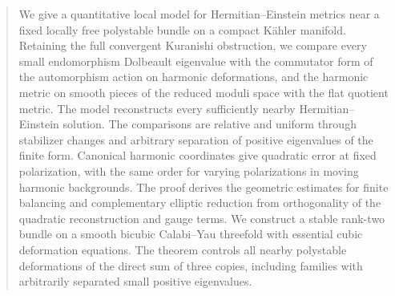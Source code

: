 

\begin{abstract}
We give a quantitative local model for Hermitian--Einstein metrics near a
fixed locally free polystable bundle on a compact K\"ahler manifold.
Retaining the full convergent Kuranishi obstruction, we compare every small
endomorphism Dolbeault eigenvalue with the commutator form of the automorphism
action on harmonic deformations, and the harmonic metric on smooth pieces
of the reduced moduli space with the flat quotient metric. The model
reconstructs every sufficiently nearby Hermitian--Einstein solution.
The comparisons are relative and uniform through stabilizer changes and
arbitrary separation of positive eigenvalues of the finite form.
Canonical harmonic coordinates give quadratic error at fixed polarization,
with the same order for varying polarizations in moving harmonic backgrounds.
The proof derives the geometric estimates for finite balancing and
complementary elliptic reduction from orthogonality of the quadratic
reconstruction and gauge terms. We construct a stable rank-two bundle on a
smooth bicubic Calabi--Yau threefold with essential cubic deformation equations.
The theorem controls all nearby polystable deformations of the direct sum
of three copies, including families with arbitrarily separated small
positive eigenvalues.
\end{abstract}
\maketitle










